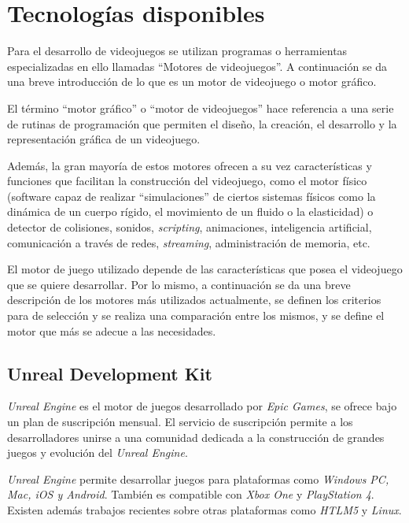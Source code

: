 \section{Tecnologías disponibles}

Para el desarrollo de videojuegos se utilizan programas o herramientas
especializadas en ello llamadas \enquote{Motores de videojuegos}. A continuación
se da una breve introducción de lo que es un motor de videojuego o motor
gráfico.

El término \enquote{motor gráfico} o \enquote{motor de videojuegos} hace
referencia a una serie de rutinas de programación que permiten el diseño, la
creación, el desarrollo y la representación gráfica de un
videojuego\cite{videojuego:telechea}.

Además, la gran mayoría de estos motores ofrecen a su vez características y
funciones que facilitan la construcción del videojuego, como el motor físico
(software capaz de realizar \enquote{simulaciones} de ciertos sistemas físicos
como la dinámica de un cuerpo rígido, el movimiento de un fluido o la
elasticidad) o detector de colisiones, sonidos, \textit{scripting}, animaciones,
inteligencia artificial, comunicación a través de redes, \textit{streaming},
administración de memoria, etc\cite{videojuego:telechea}.

El motor de juego utilizado depende de las características que posea el
videojuego que se quiere desarrollar. Por lo mismo, a continuación se da una
breve descripción de los motores más utilizados actualmente, se definen los
criterios para de selección y se realiza una comparación entre los mismos, y se
define el motor que más se adecue a las necesidades.

\subsection{Unreal Development Kit}

\textit{Unreal Engine} es el motor de juegos desarrollado por \textit{Epic
    Games}, se ofrece bajo un plan de suscripción mensual. El servicio de
suscripción permite a los desarrolladores unirse a una comunidad dedicada a la
construcción de grandes juegos y evolución del \textit{Unreal
    Engine}\cite{unrealengine}.

\textit{Unreal Engine} permite desarrollar juegos para plataformas como
\textit{Windows PC, Mac, iOS y Android}. También es compatible con \textit{Xbox
    One} y \textit{PlayStation 4}. Existen además trabajos recientes sobre otras
plataformas como \textit{HTLM5} y \textit{Linux}\cite{unrealengine}.

